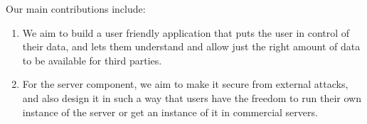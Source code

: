 Our main contributions include:
\begin{enumerate}
	\item We aim to build a user friendly application that puts the user in control of their data, and lets them understand and allow just the right amount of data to be available for third parties.

	\item For the server component, we aim to make it secure from external attacks, and also design it in such a way that users have the freedom to run their own instance of the server or get an instance of it in commercial servers.
\end{enumerate}